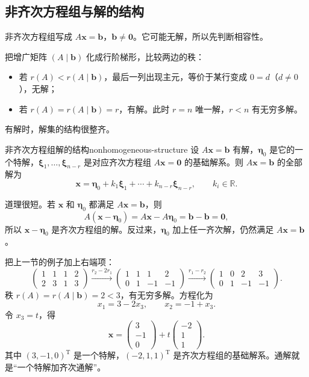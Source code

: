 \subsection{非齐次方程组与解的结构}

非齐次方程组写成 \(A\boldsymbol x=\boldsymbol b\)，\(\boldsymbol b\ne\boldsymbol 0\)。它可能无解，所以先判断相容性。

把增广矩阵 \((A\mid\boldsymbol b)\) 化成行阶梯形，比较两边的秩：
\begin{itemize}
\item 若 \(r(A)<r(A\mid\boldsymbol b)\)，最后一列出现主元，等价于某行变成 \(0=d\)（\(d\ne0\)），无解；
\item 若 \(r(A)=r(A\mid\boldsymbol b)=r\)，有解。此时 \(r=n\) 唯一解，\(r<n\) 有无穷多解。
\end{itemize}

有解时，解集的结构很整齐。

\begin{conclusion}{非齐次方程组解的结构}{nonhomogeneous-structure}
设 \(A\boldsymbol x=\boldsymbol b\) 有解，\(\boldsymbol\eta_0\) 是它的一个特解，\(\boldsymbol\xi_1,\ldots,\boldsymbol\xi_{n-r}\) 是对应齐次方程组 \(A\boldsymbol x=\boldsymbol 0\) 的基础解系。则 \(A\boldsymbol x=\boldsymbol b\) 的全部解为
\[
\boldsymbol x=\boldsymbol\eta_0+k_1\boldsymbol\xi_1+\cdots+k_{n-r}\boldsymbol\xi_{n-r},
\qquad k_i\in\mathbb R.
\]
\end{conclusion}

道理很短。若 \(\boldsymbol x\) 和 \(\boldsymbol\eta_0\) 都满足 \(A\boldsymbol x=\boldsymbol b\)，则
\[
A(\boldsymbol x-\boldsymbol\eta_0)=A\boldsymbol x-A\boldsymbol\eta_0=\boldsymbol b-\boldsymbol b=\boldsymbol 0,
\]
所以 \(\boldsymbol x-\boldsymbol\eta_0\) 是齐次方程组的解。反过来，\(\boldsymbol\eta_0\) 加上任一齐次解，仍然满足 \(A\boldsymbol x=\boldsymbol b\)。

把上一节的例子加上右端项：
\[
\left(\begin{array}{ccc|c}
1&1&1&2\\
2&3&1&3
\end{array}\right)
\xrightarrow{r_2-2r_1}
\left(\begin{array}{ccc|c}
1&1&1&2\\
0&1&-1&-1
\end{array}\right)
\xrightarrow{r_1-r_2}
\left(\begin{array}{ccc|c}
1&0&2&3\\
0&1&-1&-1
\end{array}\right).
\]
秩 \(r(A)=r(A\mid\boldsymbol b)=2<3\)，有无穷多解。方程化为
\[
x_1=3-2x_3,\qquad x_2=-1+x_3.
\]
令 \(x_3=t\)，得
\[
\boldsymbol x=\begin{pmatrix}3\\-1\\0\end{pmatrix}
+t\begin{pmatrix}-2\\1\\1\end{pmatrix}.
\]
其中 \((3,-1,0)^{\mathrm T}\) 是一个特解，\((-2,1,1)^{\mathrm T}\) 是齐次方程组的基础解系。通解就是“一个特解加齐次通解”。

